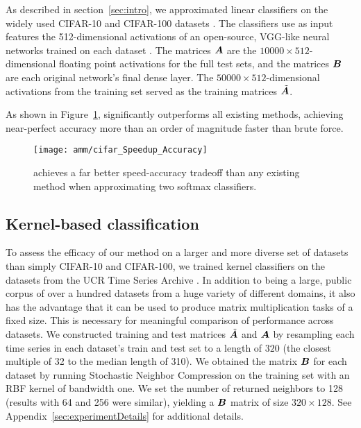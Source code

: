 As described in section~\ref{sec:intro}, we approximated linear classifiers on the widely used CIFAR-10 and CIFAR-100 datasets \cite{cifarDsets}. The classifiers use as input features the 512-dimensional activations of an open-source, VGG-like neural networks trained on each dataset \cite{cifarVgg}. The matrices $\bm{A}$ are the $10000 \times 512$-dimensional floating point activations for the full test sets, and the matrices $\bm{B}$ are each original network's final dense layer. The $50000 \times 512$-dimensional activations from the training set served as the training matrices $\tilde{\bm{A}}$.

As shown in Figure~\ref{fig:cifar}, \oursp significantly outperforms all existing methods, achieving near-perfect accuracy more than an order of magnitude faster than brute force.

\begin{figure}[h]
\begin{center}
\texttt{[image: amm/cifar\_Speedup\_Accuracy]}
\caption{\oursp achieves a far better speed-accuracy tradeoff than any existing method when approximating two softmax classifiers.}
\label{fig:cifar}
\end{center}
\end{figure}

\subsection{Kernel-based classification}

To assess the efficacy of our method on a larger and more diverse set of datasets than simply CIFAR-10 and CIFAR-100, we trained kernel classifiers on the datasets from the UCR Time Series Archive \cite{UCRArchive2018}. In addition to being a large, public corpus of over a hundred datasets from a huge variety of different domains, it also has the advantage that it can be used to produce matrix multiplication tasks of a fixed size. This is necessary for meaningful comparison of performance across datasets. We constructed training and test matrices $\tilde{\bm{A}}$ and $\bm{A}$ by resampling each time series in each dataset's train and test set to a length of $320$ (the closest multiple of 32 to the median length of 310). We obtained the matrix $\bm{B}$ for each dataset by running Stochastic Neighbor Compression \cite{snc} on the training set with an RBF kernel of bandwidth one. We set the number of returned neighbors to 128 (results with 64 and 256 were similar), yielding a $\bm{B}$ matrix of size $320 \times 128$. See Appendix~\ref{sec:experimentDetails} for additional details.

